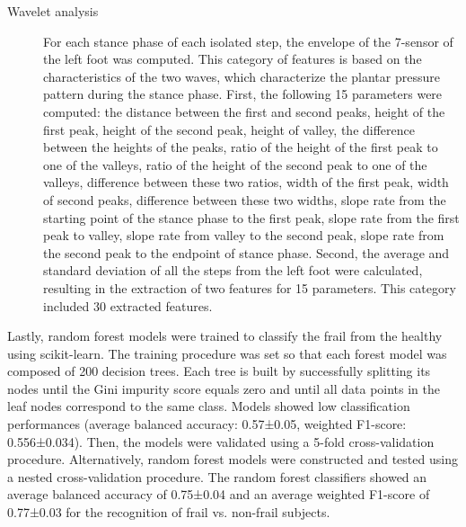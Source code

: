 \begin{description}
    \item[Wavelet analysis] For each stance phase of each isolated step, the envelope of the 7-sensor of the left foot was computed. This category of features is based on the characteristics of the two waves, which characterize the plantar pressure pattern during the stance phase. First, the following 15 parameters were computed: the distance between the first and second peaks, height of the first peak, height of the second peak, height of valley, the difference between the heights of the peaks, ratio of the height of the first peak to one of the valleys, ratio of the height of the second peak to one of the valleys, difference between these two ratios, width of the first peak, width of second peaks, difference between these two widths, slope rate from the starting point of the stance phase to the first peak, slope rate from the first peak to valley, slope rate from valley to the second peak, slope rate from the second peak to the endpoint of stance phase. Second, the average and standard deviation of all the steps from the left foot were calculated, resulting in the extraction of two features for 15 parameters. This category included 30 extracted features.
\end{description}

Lastly, random forest models were trained to classify the frail from the healthy using scikit-learn. The training procedure was set so that each forest model was composed of 200 decision trees. Each tree is built by successfully splitting its nodes until the Gini impurity score equals zero and until all data points in the leaf nodes correspond to the same class.
Models showed low classification performances (average balanced accuracy: 0.57±0.05, weighted F1-score: 0.556±0.034).
Then, the models were validated using a 5-fold cross-validation procedure.  Alternatively, random forest models were constructed and tested using a nested cross-validation procedure. 
The random forest classifiers showed an average balanced accuracy of 0.75±0.04 and an average weighted F1-score of 0.77±0.03 for the recognition of frail vs. non-frail subjects.

